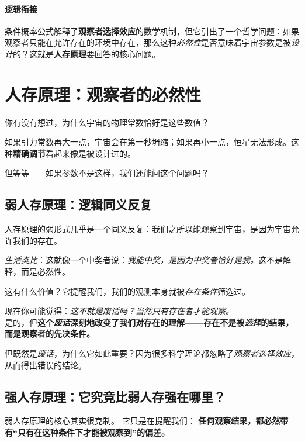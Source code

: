 \documentclass[../main.tex]{subfiles}
\begin{document}
	\paragraph*{逻辑衔接}
	条件概率公式解释了\textbf{观察者选择效应}的数学机制，但它引出了一个哲学问题：如果观察者只能在允许存在的环境中存在，那么这种\textit{必然性}是否意味着宇宙参数是被\textit{设计}的？这就是\textbf{人存原理}要回答的核心问题。

	\section{人存原理：观察者的必然性}

	你有没有想过，为什么宇宙的物理常数恰好是这些数值？

	如果引力常数再大一点，宇宙会在第一秒坍缩；如果再小一点，恒星无法形成。这种\textbf{精确调节}看起来像是被设计过的。

	但等等——如果参数不是这样，我们还能问这个问题吗？

	\subsection{弱人存原理：逻辑同义反复}

	人存原理的弱形式几乎是一个同义反复：我们之所以能观察到宇宙，是因为宇宙允许我们的存在。

	\textit{生活类比}：这就像一个中奖者说：\textit{我能中奖，是因为中奖者恰好是我。}这不是解释，而是必然性。

	这有什么价值？它提醒我们，我们的观测本身就被\textit{存在条件}筛选过。

	\begin{tcolorbox}[colback=yellow!5, title=\textit{读者行为预测}]
		现在你可能觉得：\textit{这不就是废话吗？当然只有存在者才能观察。}\\
		是的，但\textbf{这个\textit{废话}深刻地改变了我们对\textbf{存在}的理解——存在不是被\textit{选择}的结果，而是观察者的先决条件。}
	\end{tcolorbox}

	但既然是\textit{废话}，为什么它如此重要？因为很多科学理论都忽略了\textit{观察者选择效应}，从而得出错误的结论。
	
	
\subsection{强人存原理：它究竟比弱人存强在哪里？}

弱人存原理的核心其实很克制。  
它只是在提醒我们：  
\textbf{任何观察结果，都必然带有“只有在这种条件下才能被观察到”的偏差。}
\end{document}
